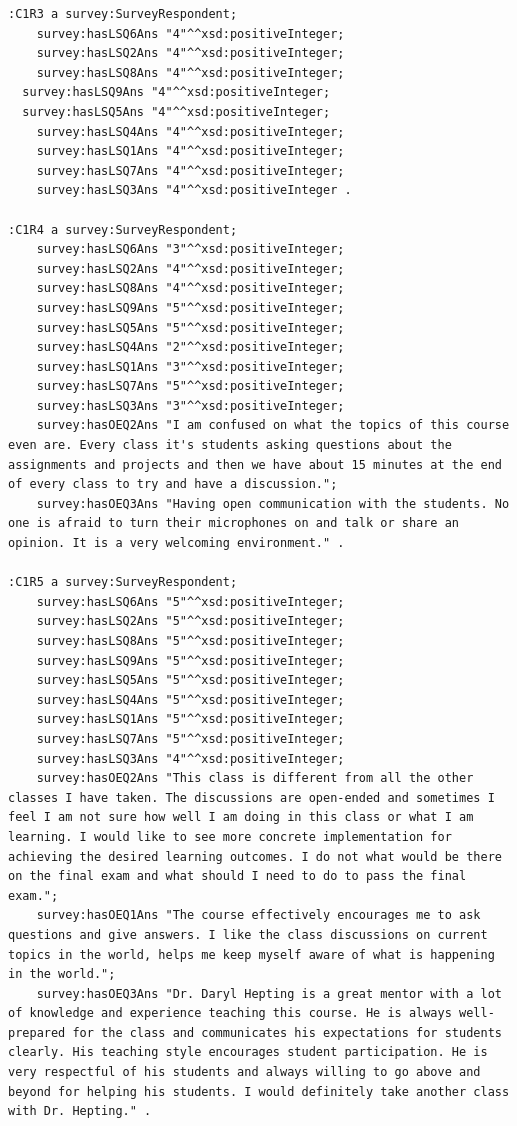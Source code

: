 \begin{lstlisting}
:C1R3 a survey:SurveyRespondent;
	survey:hasLSQ6Ans "4"^^xsd:positiveInteger;
	survey:hasLSQ2Ans "4"^^xsd:positiveInteger;
	survey:hasLSQ8Ans "4"^^xsd:positiveInteger;
  survey:hasLSQ9Ans "4"^^xsd:positiveInteger;
  survey:hasLSQ5Ans "4"^^xsd:positiveInteger;
	survey:hasLSQ4Ans "4"^^xsd:positiveInteger;
	survey:hasLSQ1Ans "4"^^xsd:positiveInteger;
	survey:hasLSQ7Ans "4"^^xsd:positiveInteger;
	survey:hasLSQ3Ans "4"^^xsd:positiveInteger .

:C1R4 a survey:SurveyRespondent;
 	survey:hasLSQ6Ans "3"^^xsd:positiveInteger;
	survey:hasLSQ2Ans "4"^^xsd:positiveInteger;
	survey:hasLSQ8Ans "4"^^xsd:positiveInteger;
	survey:hasLSQ9Ans "5"^^xsd:positiveInteger;
	survey:hasLSQ5Ans "5"^^xsd:positiveInteger;
	survey:hasLSQ4Ans "2"^^xsd:positiveInteger;
	survey:hasLSQ1Ans "3"^^xsd:positiveInteger;
	survey:hasLSQ7Ans "5"^^xsd:positiveInteger;
	survey:hasLSQ3Ans "3"^^xsd:positiveInteger;
	survey:hasOEQ2Ans "I am confused on what the topics of this course even are. Every class it's students asking questions about the assignments and projects and then we have about 15 minutes at the end of every class to try and have a discussion.";
	survey:hasOEQ3Ans "Having open communication with the students. No one is afraid to turn their microphones on and talk or share an opinion. It is a very welcoming environment." .

:C1R5 a survey:SurveyRespondent;
	survey:hasLSQ6Ans "5"^^xsd:positiveInteger;
	survey:hasLSQ2Ans "5"^^xsd:positiveInteger;
	survey:hasLSQ8Ans "5"^^xsd:positiveInteger;
	survey:hasLSQ9Ans "5"^^xsd:positiveInteger;
	survey:hasLSQ5Ans "5"^^xsd:positiveInteger;
	survey:hasLSQ4Ans "5"^^xsd:positiveInteger;
	survey:hasLSQ1Ans "5"^^xsd:positiveInteger;
	survey:hasLSQ7Ans "5"^^xsd:positiveInteger;
	survey:hasLSQ3Ans "4"^^xsd:positiveInteger;
	survey:hasOEQ2Ans "This class is different from all the other classes I have taken. The discussions are open-ended and sometimes I feel I am not sure how well I am doing in this class or what I am learning. I would like to see more concrete implementation for achieving the desired learning outcomes. I do not what would be there on the final exam and what should I need to do to pass the final exam.";
	survey:hasOEQ1Ans "The course effectively encourages me to ask questions and give answers. I like the class discussions on current topics in the world, helps me keep myself aware of what is happening in the world.";
	survey:hasOEQ3Ans "Dr. Daryl Hepting is a great mentor with a lot of knowledge and experience teaching this course. He is always well-prepared for the class and communicates his expectations for students clearly. His teaching style encourages student participation. He is very respectful of his students and always willing to go above and beyond for helping his students. I would definitely take another class with Dr. Hepting." .


\end{lstlisting}
